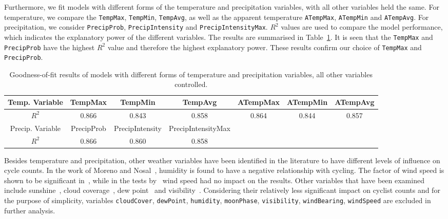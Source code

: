 \documentclass [11pt, proquest] {uwthesis}[2015/03/03]
\begin{document}
Furthermore, we fit models with different forms of the temperature and precipitation variables, with all other variables held the same. For temperature, we compare the \texttt{TempMax}, \texttt{TempMin}, \texttt{TempAvg}, as well as the apparent temperature \texttt{ATempMax}, \texttt{ATempMin} and \texttt{ATempAvg}. For precipitation, we consider \texttt{PrecipProb}, \texttt{PrecipIntensity} and \texttt{PrecipIntensityMax}. $R^2$ values are used to compare the model performance, which indicates the explanatory power of the different variables. The results are summarised in Table~\ref{tbl:variableselection}. It is seen that the \texttt{TempMax} and \texttt{PrecipProb} have the highest $R^2$ value and therefore the highest explanatory power. These results confirm our choice of \texttt{TempMax} and \texttt{PrecipProb}.

\begin{table}
\small
\begin{tabular}{| c | c | c | c | c | c | c |} 
\hline 
  Temp. Variable & TempMax & TempMin & TempAvg & ATempMax & ATempMin & ATempAvg \\ 
\hline
  $R^2$  & 0.866 & 0.843 & 0.858 & 0.864 & 0.844 & 0.857 \\ 
\hline \hline
  Precip. Variable & PrecipProb & PrecipIntensity & PrecipIntensityMax &  &  &  \\ 
\hline
  $R^2$  & 0.866 & 0.860 & 0.858 & & & \\
\hline
\end{tabular} 
\caption{Goodness-of-fit results of models with different forms of temperature and precipitation variables, all other variables controlled.} 
\label{tbl:variableselection} 
\vspace{-1.15cm}
\end{table} 

Besides temperature and precipitation, other weather variables have been identified in the literature to have different levels of influence on cycle counts. In the work of Moreno and Nosal~\cite{Miranda-Moreno:2011aa}, humidity is found to have a negative relationship with cycling. The factor of wind speed is shown to be significant in~\cite{Thomas12}, while in the tests by~\cite{Miranda-Moreno:2011aa} wind speed had no impact on the results. Other variables that have been examined include sunshine~\cite{Thomas12}, cloud coverage~\cite{Hanson77}, dew point~\cite{Schade14,Nosal:2014aa} and visibility~\cite{Thomas:2009aa}. Considering their relatively less significant impact on cyclist counts and for the purpose of simplicity, variables \texttt{cloudCover}, \texttt{dewPoint}, \texttt{humidity}, \texttt{moonPhase}, \texttt{visibility}, \texttt{windBearing}, \texttt{windSpeed} are excluded in further analysis. 
\end{document}
